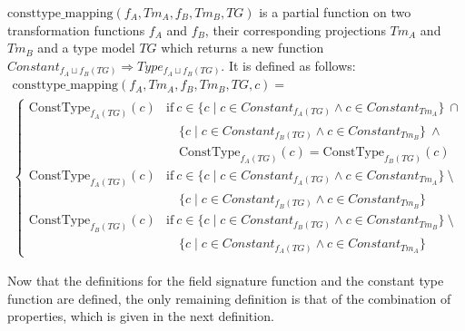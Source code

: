 \begin{defin}
\label{defin:transformation_framework:type_models_and_type_graphs:combining_transformation_functions:consttype_mapping}
$\mathrm{consttype\_\!mapping}(f_A, Tm_A, f_B, Tm_B, TG)$ is a partial function on two transformation functions $f_A$ and $f_B$, their corresponding projections $Tm_A$ and $Tm_B$ and a type model $TG$ which returns a new function $Constant_{f_{A} \sqcup f_{B}(TG)} \Rightarrow Type_{f_{A} \sqcup f_{B}(TG)}$. It is defined as follows:
\begin{multline*}
    \mathrm{consttype\_\!mapping}(f_A, Tm_A, f_B, Tm_B, TG, c) = \\
    \begin{cases}
        \mathrm{ConstType}_{f_{A}(TG)}(c) & \mathrm{if}\ c \in \{c \mid c \in Constant_{f_{A}(TG)} \land c \in Constant_{Tm_A} \}\ \cap\\&\quad\{c \mid c \in Constant_{f_{B}(TG)} \land c \in Constant_{Tm_B} \}\ \land\\&\quad \mathrm{ConstType}_{f_{A}(TG)}(c) = \mathrm{ConstType}_{f_{B}(TG)}(c) \\
        \mathrm{ConstType}_{f_{A}(TG)}(c) & \mathrm{if}\ c \in \{c \mid c \in Constant_{f_{A}(TG)} \land c \in Constant_{Tm_A} \}\ \setminus\\&\quad \{c \mid c \in Constant_{f_{B}(TG)} \land c \in Constant_{Tm_B} \} \\
        \mathrm{ConstType}_{f_{B}(TG)}(c) & \mathrm{if}\ c \in \{c \mid c \in Constant_{f_{B}(TG)} \land c \in Constant_{Tm_B} \}\ \setminus\\&\quad \{c \mid c \in Constant_{f_{A}(TG)} \land c \in Constant_{Tm_A} \}
    \end{cases}
\end{multline*}
\end{defin}

Now that the definitions for the field signature function and the constant type function are defined, the only remaining definition is that of the combination of properties, which is given in the next definition.

